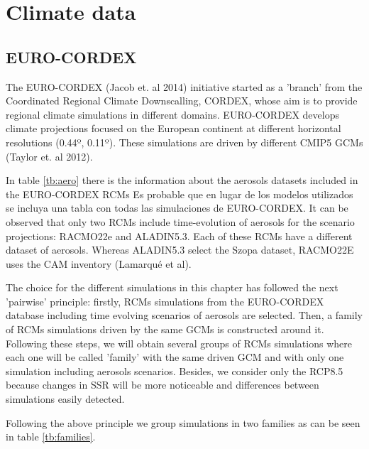 \section{Climate data}

\subsection{EURO-CORDEX}

The EURO-CORDEX (Jacob et. al 2014) initiative started as a 'branch' from the Coordinated Regional Climate Downscalling, CORDEX, whose aim is to provide regional climate simulations in different domains. EURO-CORDEX develops climate projections focused on the European continent at different horizontal resolutions (0.44º, 0.11º). These simulations are driven by different CMIP5 GCMs (Taylor et. al 2012).

In table \ref{tb:aero} there is the information about the aerosols datasets included in the EURO-CORDEX RCMs {\color{red}Es probable que en lugar de los modelos utilizados se incluya una tabla con todas las simulaciones de EURO-CORDEX}. It can be observed that only two RCMs include time-evolution of aerosols for the scenario projections: RACMO22e and ALADIN5.3. Each of these RCMs have a different dataset of aerosols. Whereas ALADIN5.3 select the Szopa dataset, RACMO22E uses the CAM inventory (Lamarqué et al).

The choice for the different simulations in this chapter has followed the next 'pairwise' principle: firstly, RCMs simulations from the EURO-CORDEX database including time evolving scenarios of aerosols are selected. Then, a family of RCMs simulations driven by the same GCMs is constructed around it. Following these steps, we will obtain several groups of RCMs simulations where each one will be called 'family' with the same driven GCM and with only one simulation including aerosols scenarios. Besides, we consider only the RCP8.5 because changes in SSR will be more noticeable and differences between simulations easily detected. 

Following the above principle we group simulations in two families as can be seen in table \ref{tb:families}.

